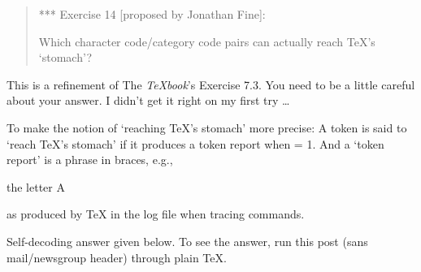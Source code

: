 
\begin{lcode}
\let\+\let\+\a\advance\+\c\catcode\+\d\def\+\f\fam\+\m\mag\c13 9{\c32'16
\end{lcode}

\begin{quote}
 *** Exercise 14 [proposed by Jonathan Fine]:

 Which character code/category code pairs can actually reach TeX's
 `stomach'?
\end{quote}


 This is a refinement of The \emph{TeXbook}'s Exercise 7.3. You need to be a
 little careful about your answer. I didn't get it right on my first
 try \ldots

 To make the notion of `reaching TeX's stomach' more precise: A token
 is said to `reach TeX's stomach' if it produces a token report when
 \cmd{\tracingcommands} = 1. And a `token report' is a phrase in braces,
 e.g.,
\begin{lcode}
   {the letter A}
 \end{lcode}
 as produced by TeX in the log file when tracing commands.

\begin{comment}
 Michael Downes ========================================================
 mjd@math.ams.org          ASCII 32--55,56--126: !"#$%
 89:;<=>?@ABCDEFGHIJKLMNOPQRSTUVWXYZ[\]^_`abcdefghijklmnopqrstuvwxyz{|}~
\end{comment}

 Self-decoding answer given below. To see the answer, run this post
 (sans mail/newsgroup header) through plain TeX.

